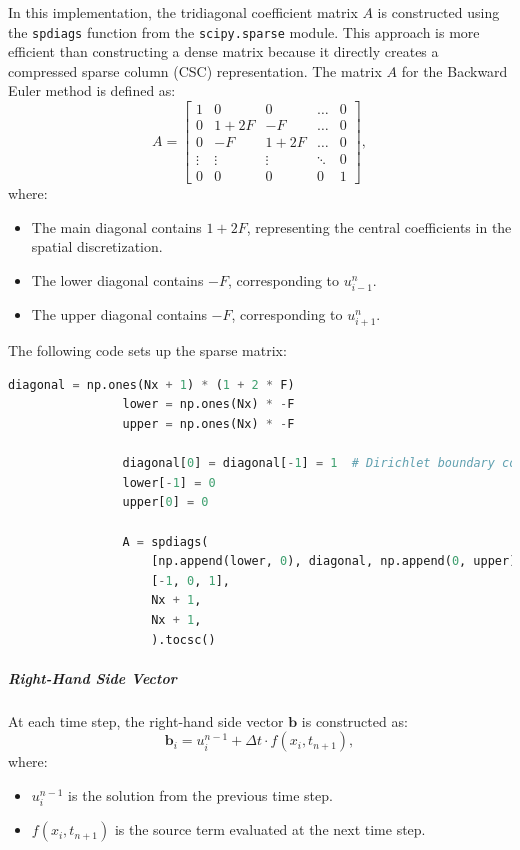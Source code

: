 \documentclass{article}
\begin{document}
			In this implementation, the tridiagonal coefficient matrix \( A \) is constructed using the \texttt{spdiags} function from the \texttt{scipy.sparse} module. This approach is more efficient than constructing a dense matrix because it directly creates a compressed sparse column (CSC) representation. The matrix \( A \) for the Backward Euler method is defined as:
			\[
			A = 
			\begin{bmatrix}
				1 & 0 & 0 & \dots & 0 \\
				0 & 1 + 2F & -F & \dots & 0 \\
				0 & -F & 1 + 2F & \dots & 0 \\
				\vdots & \vdots & \vdots & \ddots & 0 \\
				0 & 0 & 0 & 0 & 1
			\end{bmatrix},
			\]
			where:
			\begin{itemize}
				\item The main diagonal contains \( 1 + 2F \), representing the central coefficients in the spatial discretization.
				\item The lower diagonal contains \( -F \), corresponding to \( u_{i-1}^{n} \).
				\item The upper diagonal contains \( -F \), corresponding to \( u_{i+1}^{n} \).
			\end{itemize}
			
			The following code sets up the sparse matrix:
			\begin{lstlisting}[language=Python]
				diagonal = np.ones(Nx + 1) * (1 + 2 * F)
				lower = np.ones(Nx) * -F
				upper = np.ones(Nx) * -F
				
				diagonal[0] = diagonal[-1] = 1  # Dirichlet boundary conditions
				lower[-1] = 0
				upper[0] = 0
				
				A = spdiags(
					[np.append(lower, 0), diagonal, np.append(0, upper)],
					[-1, 0, 1],
					Nx + 1,
					Nx + 1,
					).tocsc()
			\end{lstlisting}
			
			\subparagraph{Right-Hand Side Vector}
			
			At each time step, the right-hand side vector \( \mathbf{b} \) is constructed as:
			\[
			\mathbf{b}_i = u_i^{n-1} + \Delta t \cdot f(x_i, t_{n+1}),
			\]
			where:
			\begin{itemize}
				\item \( u_i^{n-1} \) is the solution from the previous time step.
				\item \( f(x_i, t_{n+1}) \) is the source term evaluated at the next time step.
			\end{itemize}
			
\end{document}

